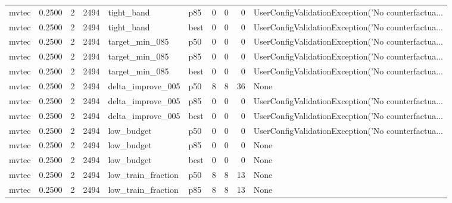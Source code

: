 \begin{tabular}{lrrrllrrrl}
   mvtec &    0.2500 &    2 &   2494 &           tight\_band &    p85 &               0 &          0 &       0 & UserConfigValidationException('No counterfactua... \\
   mvtec &    0.2500 &    2 &   2494 &           tight\_band &   best &               0 &          0 &       0 & UserConfigValidationException('No counterfactua... \\
   mvtec &    0.2500 &    2 &   2494 &       target\_min\_085 &    p50 &               0 &          0 &       0 & UserConfigValidationException('No counterfactua... \\
   mvtec &    0.2500 &    2 &   2494 &       target\_min\_085 &    p85 &               0 &          0 &       0 & UserConfigValidationException('No counterfactua... \\
   mvtec &    0.2500 &    2 &   2494 &       target\_min\_085 &   best &               0 &          0 &       0 & UserConfigValidationException('No counterfactua... \\
   mvtec &    0.2500 &    2 &   2494 &    delta\_improve\_005 &    p50 &               8 &          8 &      36 &                                               None \\
   mvtec &    0.2500 &    2 &   2494 &    delta\_improve\_005 &    p85 &               0 &          0 &       0 & UserConfigValidationException('No counterfactua... \\
   mvtec &    0.2500 &    2 &   2494 &    delta\_improve\_005 &   best &               0 &          0 &       0 & UserConfigValidationException('No counterfactua... \\
   mvtec &    0.2500 &    2 &   2494 &           low\_budget &    p50 &               0 &          0 &       0 & UserConfigValidationException('No counterfactua... \\
   mvtec &    0.2500 &    2 &   2494 &           low\_budget &    p85 &               0 &          0 &       0 &                                               None \\
   mvtec &    0.2500 &    2 &   2494 &           low\_budget &   best &               0 &          0 &       0 &                                               None \\
   mvtec &    0.2500 &    2 &   2494 &   low\_train\_fraction &    p50 &               8 &          8 &      13 &                                               None \\
   mvtec &    0.2500 &    2 &   2494 &   low\_train\_fraction &    p85 &               8 &          8 &      13 &                                               None \\

\end{tabular}
